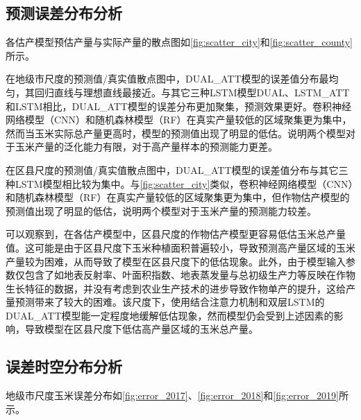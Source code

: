 \subsection{预测误差分布分析}

\par 各估产模型预估产量与实际产量的散点图如\autoref{fig:scatter_city}和\autoref{fig:scatter_county}所示。

\begin{figure}
  \centering
  \hfill
\end{figure}

\par 在地级市尺度的预测值/真实值散点图中，DUAL\_ATT模型的误差值分布最均匀，其回归直线与理想直线最接近。与其它三种LSTM模型DUAL、LSTM\_ATT和LSTM相比，DUAL\_ATT模型的误差分布更加聚集，预测效果更好。卷积神经网络模型（CNN）和随机森林模型（RF）在真实产量较低的区域聚集更为集中，然而当玉米实际总产量更高时，模型的预测值出现了明显的低估。说明两个模型对于玉米产量的泛化能力有限，对于高产量样本的预测能力更差。

\par 在区县尺度的预测值/真实值散点图中，DUAL\_ATT模型的误差值分布与其它三种LSTM模型相比较为集中。与\autoref{fig:scatter_city}类似，卷积神经网络模型（CNN）和随机森林模型（RF）在真实产量较低的区域聚集更为集中，但作物估产模型的预测值出现了明显的低估，说明两个模型对于玉米产量的预测能力较差。

\par 可以观察到，在各估产模型中，区县尺度的作物估产模型更容易低估玉米总产量值。这可能是由于区县尺度下玉米种植面积普遍较小，导致预测高产量区域的玉米产量较为困难，从而导致了模型在区县尺度下的低估现象。此外，由于模型输入参数仅包含了如地表反射率、叶面积指数、地表蒸发量与总初级生产力等反映在作物生长特征的数据，并没有考虑到农业生产技术的进步导致作物单产的提升，这给产量预测带来了较大的困难。该尺度下，使用结合注意力机制和双层LSTM的DUAL\_ATT模型能一定程度地缓解低估现象，然而模型仍会受到上述因素的影响，导致模型在区县尺度下低估高产量区域的玉米总产量。

\subsection{误差时空分布分析}

\par 地级市尺度玉米误差分布如\autoref{fig:error_2017}、\autoref{fig:error_2018}和\autoref{fig:error_2019}所示。

